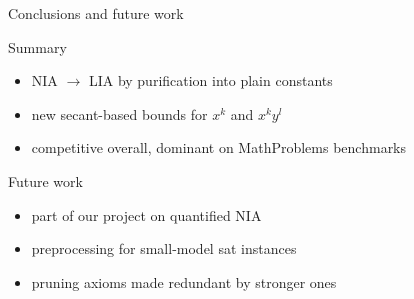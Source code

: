 \documentclass[11pt]{beamer}
\begin{document}
\begin{frame}{Conclusions and future work}
	\begin{block}{Summary}
		\begin{itemize}
			\item NIA $\to$ LIA by purification into plain constants
			\item new \alert{secant-based} bounds for $x^k$ and $x^ky^l$
			\item competitive overall, \alert{dominant} on MathProblems benchmarks
		\end{itemize}
	\end{block}
	\begin{block}{Future work}
		\begin{itemize}
			\item part of our project on quantified NIA
			\item preprocessing for small-model sat instances
			\item pruning axioms made redundant by stronger ones
		\end{itemize}
	\end{block}
\end{frame}
\end{document}
